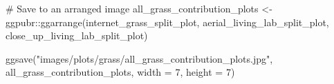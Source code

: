 \documentclass[
  letterpaper,
  DIV=11,
  numbers=noendperiod]{scrreprt}
\newenvironment{Shaded}{\begin{snugshade}}{\end{snugshade}}
\newcommand{\AttributeTok}[1]{\textcolor[rgb]{0.40,0.45,0.13}{#1}}
\newcommand{\CommentTok}[1]{\textcolor[rgb]{0.37,0.37,0.37}{#1}}
\newcommand{\DecValTok}[1]{\textcolor[rgb]{0.68,0.00,0.00}{#1}}
\newcommand{\FunctionTok}[1]{\textcolor[rgb]{0.28,0.35,0.67}{#1}}
\newcommand{\NormalTok}[1]{\textcolor[rgb]{0.00,0.23,0.31}{#1}}
\newcommand{\OtherTok}[1]{\textcolor[rgb]{0.00,0.23,0.31}{#1}}
\newcommand{\SpecialCharTok}[1]{\textcolor[rgb]{0.37,0.37,0.37}{#1}}
\newcommand{\StringTok}[1]{\textcolor[rgb]{0.13,0.47,0.30}{#1}}
\begin{document}
\begin{Shaded}
\begin{Highlighting}[]
\CommentTok{\# Save to an arranged image}
\NormalTok{all\_grass\_contribution\_plots }\OtherTok{\textless{}{-}}\NormalTok{ ggpubr}\SpecialCharTok{::}\FunctionTok{ggarrange}\NormalTok{(internet\_grass\_split\_plot, }
\NormalTok{                                                  aerial\_living\_lab\_split\_plot, }
\NormalTok{                                                  close\_up\_living\_lab\_split\_plot)}

\FunctionTok{ggsave}\NormalTok{(}\StringTok{"images/plots/grass/all\_grass\_contribution\_plots.jpg"}\NormalTok{, }
\NormalTok{       all\_grass\_contribution\_plots, }
       \AttributeTok{width =} \DecValTok{7}\NormalTok{, }
       \AttributeTok{height =} \DecValTok{7}\NormalTok{)}
\end{Highlighting}
\end{Shaded}
\end{document}
